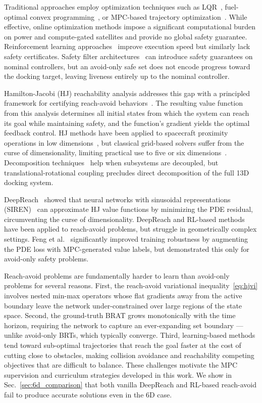 \documentclass[letterpaper, 10 pt, conference]{ieeeconf}
\begin{document}
Traditional approaches employ optimization techniques such as LQR~\cite{jewison2016}, fuel-optimal convex programming~\cite{malyuta2022}, or MPC-based trajectory optimization~\cite{eren2017}. While effective, online optimization methods impose a significant computational burden on power and compute-gated satellites and provide no global safety guarantee. Reinforcement learning approaches~\cite{hovell2021, broida2019} improve execution speed but similarly lack safety certificates. Safety filter architectures~\cite{wabersich2021, ames2019control} can introduce safety guarantees on nominal controllers, but an avoid-only safe set does not encode progress toward the docking target, leaving liveness entirely up to the nominal controller.

Hamilton-Jacobi (HJ) reachability analysis addresses this gap with a principled framework for certifying reach-avoid behaviors~\cite{mitchell2005, bansal2017hamilton}. The resulting value function from this analysis determines all initial states from which the system can reach its goal while maintaining safety, and the function's gradient yields the optimal feedback control. HJ methods have been applied to spacecraft proximity operations in low dimensions~\cite{chaudhuri2016, zagaris2018}, but classical grid-based solvers suffer from the curse of dimensionality, limiting practical use to five or six dimensions~\cite{mitchell2005, lygeros2004}. Decomposition techniques~\cite{chen2018decomposition} help when subsystems are decoupled, but translational-rotational coupling precludes direct decomposition of the full 13D docking system.

DeepReach~\cite{bansal2021deepreach} showed that neural networks with sinusoidal representations (SIREN)~\cite{sitzmann2020siren} can approximate HJ value functions by minimizing the PDE residual, circumventing the curse of dimensionality. DeepReach and RL-based methods~\cite{hsu2021safety} have been applied to reach-avoid problems, but struggle in geometrically complex settings. Feng et al.~\cite{MPCDeepReach} significantly improved training robustness by augmenting the PDE loss with MPC-generated value labels, but demonstrated this only for avoid-only safety problems.

Reach-avoid problems are fundamentally harder to learn than avoid-only problems for several reasons. First, the reach-avoid variational inequality~\eqref{eq:hjvi} involves nested min-max operators whose flat gradients away from the active boundary leave the network under-constrained over large regions of the state space. Second, the ground-truth BRAT grows monotonically with the time horizon, requiring the network to capture an ever-expanding set boundary — unlike avoid-only BRTs, which typically converge. Third, learning-based methods tend toward sub-optimal trajectories that reach the goal faster at the cost of cutting close to obstacles, making collision avoidance and reachability competing objectives that are difficult to balance. These challenges motivate the MPC supervision and curriculum strategies developed in this work. We show in Sec.~\ref{sec:6d_comparison} that both vanilla DeepReach and RL-based reach-avoid fail to produce accurate solutions even in the 6D case.
\end{document}
